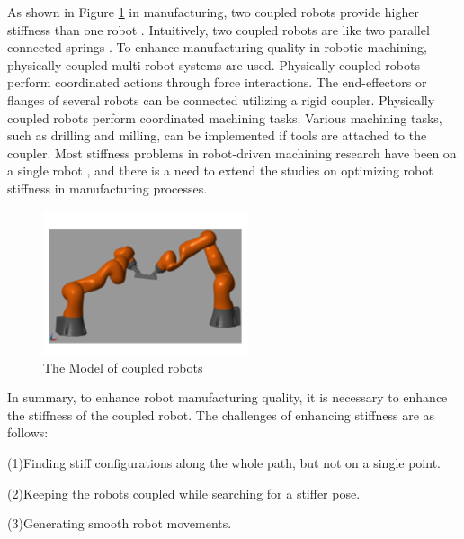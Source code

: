 As shown in Figure \ref{fig:Introduction:co_model} in manufacturing, two coupled robots provide higher stiffness than one robot \cite{VSK}. Intuitively, two coupled robots are like two parallel connected springs \cite{VSK}. To enhance manufacturing quality in robotic machining, physically coupled multi-robot systems are used. Physically coupled robots perform coordinated actions through force interactions. The end-effectors or flanges of several robots can be connected utilizing a rigid coupler. Physically coupled robots perform coordinated machining tasks. Various machining tasks, such as drilling and milling, can be implemented if tools are attached to the coupler. Most stiffness problems in robot-driven machining research have been on a single robot \cite{WPOIR} \cite{POMIR} \cite{SOPO}, and there is a need to extend the studies on optimizing robot stiffness in manufacturing processes.\par
\begin{figure}[h!]
	\centering
	\includegraphics[width=6cm]{03_images/co_model.pdf}
	\caption{The Model of coupled robots}
	\label{fig:Introduction:co_model}
\end{figure}

In summary, to enhance robot manufacturing quality, it is necessary to enhance the stiffness of the coupled robot. The challenges of enhancing stiffness are as follows:\par
(1)Finding stiff configurations along the whole path, but not on a single point.\par
(2)Keeping the robots coupled while searching for a stiffer pose.\par
(3)Generating smooth robot movements.\par

%

